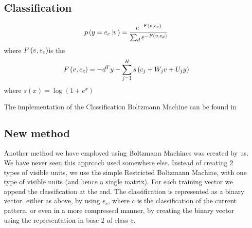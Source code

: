 \subsection{Classification}
\[ p \left( y = e_c \left| v \right. \right) = \frac{e^{- F \left( v ,
   e_c \right)}}{\sum_d e^{- F \left( v , e_d \right)}} \]
where $F \left( v , e_c \right) $is the 
\[ F \left( v , e_c \right) = - d^T y - \sum^H_{j = 1}
   {{s}} \left( c_j +   W_j v  + U_j y
   \right)  \]
where $s \left( x \right) = \log \left( 1 + e^x \right) $



The implementation of the Classification Boltzmann Machine can be found in




\subsection{New method}

Another method we have employed using Boltzmann Machines was created by us. We
have never seen this approach used somewhere else. Instead of creating 2 types
of visible units, we use the simple Restricted Boltzmann Machine, with one
type of visible units (and hence a single matrix). For each training vector
we append the classification at the end. The classification is represented as
a binary vector, either as above, by using $e_c$, where c is the
classification of the current pattern, or even in a more compressed manner, by
creating the binary vector using the representation in base 2 of class c.

\ \ \ \ \ \ \ \ \ \ \ \ \ \ \ \ \ \ \ \ \ \ \ \ \ \ \ \ \ \ \ \ \ \ \ \ \ \
\ \ \

\ \ \ \ \ \ \ \ \ \ \ \ \ \ \ \ \ \ \ \ \ \ \ \ \ \ \ \ \ \ \ \ \ \ \ \ \

